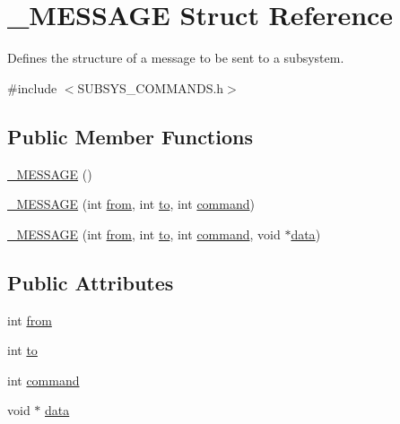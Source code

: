 \hypertarget{struct__MESSAGE}{\section{\-\_\-\-M\-E\-S\-S\-A\-G\-E Struct Reference}
\label{struct__MESSAGE}
}


Defines the structure of a message to be sent to a subsystem.  




{\ttfamily \#include $<$S\-U\-B\-S\-Y\-S\-\_\-\-C\-O\-M\-M\-A\-N\-D\-S.\-h$>$}

\subsection*{Public Member Functions}
\begin{DoxyCompactItemize}
\item 
\hyperlink{struct__MESSAGE_a2a5d3cc8c779ab1b772254ba74513216}{\-\_\-\-M\-E\-S\-S\-A\-G\-E} ()
\item 
\hyperlink{struct__MESSAGE_a338496eed6001193e85da78bf142af54}{\-\_\-\-M\-E\-S\-S\-A\-G\-E} (int \hyperlink{struct__MESSAGE_ae5e8b5fe34c20f30b5bfb8d10f69ecfd}{from}, int \hyperlink{struct__MESSAGE_ac270d2c13a196e8440f1a074e0ac7560}{to}, int \hyperlink{struct__MESSAGE_a4d7f2b7e82139f257e40d456e56bd8ab}{command})
\item 
\hyperlink{struct__MESSAGE_a299014d8bd14ade470ec293e7bb35796}{\-\_\-\-M\-E\-S\-S\-A\-G\-E} (int \hyperlink{struct__MESSAGE_ae5e8b5fe34c20f30b5bfb8d10f69ecfd}{from}, int \hyperlink{struct__MESSAGE_ac270d2c13a196e8440f1a074e0ac7560}{to}, int \hyperlink{struct__MESSAGE_a4d7f2b7e82139f257e40d456e56bd8ab}{command}, void $\ast$\hyperlink{struct__MESSAGE_a53f90bcdb7c1d0ee7bb242aed3c120a7}{data})
\end{DoxyCompactItemize}
\subsection*{Public Attributes}
\begin{DoxyCompactItemize}
\item 
int \hyperlink{struct__MESSAGE_ae5e8b5fe34c20f30b5bfb8d10f69ecfd}{from}
\item 
int \hyperlink{struct__MESSAGE_ac270d2c13a196e8440f1a074e0ac7560}{to}
\item 
int \hyperlink{struct__MESSAGE_a4d7f2b7e82139f257e40d456e56bd8ab}{command}
\item 
void $\ast$ \hyperlink{struct__MESSAGE_a53f90bcdb7c1d0ee7bb242aed3c120a7}{data}
\end{DoxyCompactItemize}


